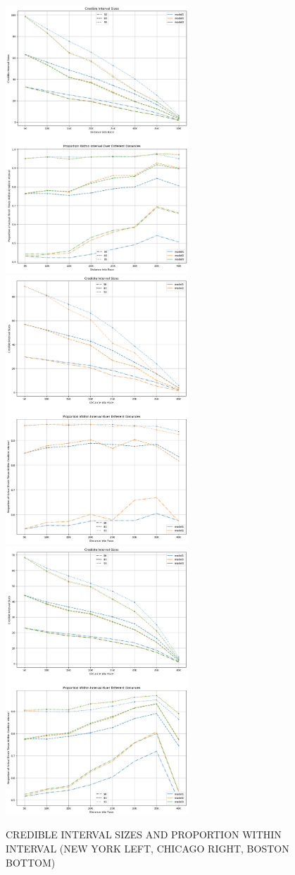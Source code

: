 \documentclass[USenglish,twocolumn]{article}
\theoremstyle{dgthm}
\theoremstyle{dgdef}
\begin{document}
\begin{figure}[ht]
    \centering
    \includegraphics[width=2.7in]{../analysis/nyc_intervals.png}
    \includegraphics[width=2.7in]{../analysis/chi_intervals.png}
     \includegraphics[width=2.7in]{../analysis/bos_intervals.png}
    \caption{CREDIBLE INTERVAL SIZES AND PROPORTION WITHIN INTERVAL (NEW YORK LEFT, CHICAGO RIGHT, BOSTON BOTTOM)}
\end{figure}
\end{document}
